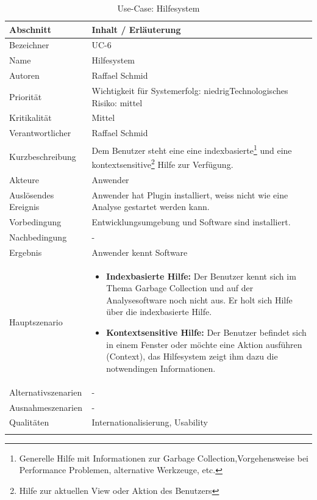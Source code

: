 \begin{longtable}{|p{4cm}|p{10.5cm}|}
\hline
   \textbf{Abschnitt} & \textbf{Inhalt / Erläuterung} \\\hline
   Bezeichner & UC-6\\\hline
   Name & Hilfesystem\\\hline
   Autoren & Raffael Schmid\\\hline
   Priorität & Wichtigkeit für Systemerfolg: niedrig\newline Technologisches Risiko: mittel\\\hline
   Kritikalität & Mittel\\\hline
   Verantwortlicher & Raffael Schmid\\\hline
   Kurzbeschreibung & Dem Benutzer steht eine eine indexbasierte\footnote{Generelle Hilfe mit Informationen zur Garbage Collection,Vorgehensweise bei Performance Problemen, alternative Werkzeuge, etc.} und eine kontextsensitive\footnote{Hilfe zur aktuellen View oder Aktion des Benutzers} Hilfe zur Verfügung. \\\hline
   Akteure & Anwender\\\hline
   Auslösendes Ereignis & Anwender hat Plugin installiert, weiss nicht wie eine Analyse gestartet werden kann.\\\hline
   Vorbedingung & Entwicklungsumgebung und Software sind installiert.\\\hline
   Nachbedingung & -\\\hline
   Ergebnis & Anwender kennt Software\\\hline
   Hauptszenario &	\begin{itemize}
		\item \textbf{Indexbasierte Hilfe: } Der Benutzer kennt sich im Thema Garbage Collection und auf der Analysesoftware noch nicht aus. Er holt sich Hilfe über die indexbasierte Hilfe. 
		\item \textbf{Kontextsensitive Hilfe: } Der Benutzer befindet sich in einem Fenster oder möchte eine Aktion ausführen (Context), das Hilfesystem zeigt ihm dazu die notwendingen Informationen.
	\end{itemize}
	\\\hline
   Alternativszenarien & -\\\hline
   Ausnahmeszenarien & -\\\hline
   Qualitäten & Internationalisierung, Usability\\\hline
\caption{Use-Case: Hilfesystem}
\end{longtable}


